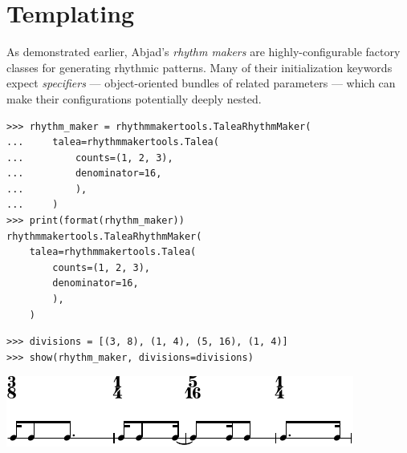 \documentclass{article}
\begin{document}
\section{Templating}

\noindent As demonstrated earlier, Abjad's \emph{rhythm makers} are highly-configurable
factory classes for generating rhythmic patterns. Many of their initialization
keywords expect \emph{specifiers} --- object-oriented bundles of related
parameters --- which can make their configurations potentially deeply nested.

\begin{lstlisting}
>>> rhythm_maker = rhythmmakertools.TaleaRhythmMaker(
...     talea=rhythmmakertools.Talea(
...         counts=(1, 2, 3),
...         denominator=16,
...         ),
...     )
>>> print(format(rhythm_maker))
rhythmmakertools.TaleaRhythmMaker(
    talea=rhythmmakertools.Talea(
        counts=(1, 2, 3),
        denominator=16,
        ),
    )
\end{lstlisting}

\begin{lstlisting}
>>> divisions = [(3, 8), (1, 4), (5, 16), (1, 4)]
>>> show(rhythm_maker, divisions=divisions)
\end{lstlisting}
\includegraphics{assets/lilypond-8d11397fa8a7ed768182e6c89abe52f0.pdf}

\end{document}

